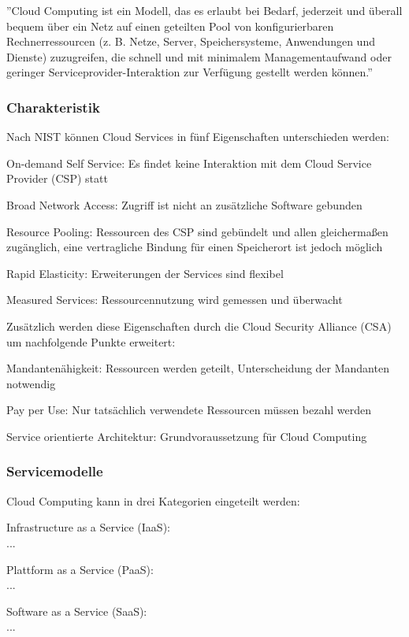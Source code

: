 \documentclass[12pt,a4paper,bibliography=totocnumbered,listof=totocnumbered]{scrartcl}
\begin{document}
''Cloud Computing ist ein Modell, das es erlaubt bei Bedarf, jederzeit und überall bequem über ein Netz auf einen geteilten Pool von konfigurierbaren Rechnerressourcen (z. B. Netze, Server, Speichersysteme, Anwendungen und Dienste) zuzugreifen, die schnell und mit minimalem Managementaufwand oder geringer Serviceprovider-Interaktion zur Verfügung gestellt werden können.''

\subsubsection{Charakteristik}
Nach NIST können Cloud Services in fünf Eigenschaften unterschieden werden:
\begin{compactitem}
	\item On-demand Self Service: Es findet keine Interaktion mit dem  Cloud Service Provider (CSP) statt
	\item Broad Network Access: Zugriff ist nicht an zusätzliche Software gebunden
	\item Resource Pooling: Ressourcen des CSP sind gebündelt und allen gleichermaßen zugänglich, eine vertragliche Bindung für einen Speicherort ist jedoch möglich
	\item Rapid Elasticity: Erweiterungen der Services sind flexibel
	\item Measured Services: Ressourcennutzung wird gemessen und überwacht
\end{compactitem}

Zusätzlich werden diese Eigenschaften durch die Cloud Security Alliance (CSA) um nachfolgende Punkte erweitert:
\begin{compactitem}
	\item Mandantenähigkeit: Ressourcen werden geteilt, Unterscheidung der Mandanten notwendig
	\item Pay per Use: Nur tatsächlich verwendete Ressourcen müssen bezahl werden
	\item Service orientierte Architektur: Grundvoraussetzung für Cloud Computing
\end{compactitem}

\subsubsection{Servicemodelle}
Cloud Computing kann in drei Kategorien eingeteilt werden:
\begin{compactitem}
\item Infrastructure as a Service (IaaS):\\
...
\item Plattform as a Service (PaaS):\\
...
\item Software as a Service (SaaS):\\
...
\end{compactitem}
\end{document}
